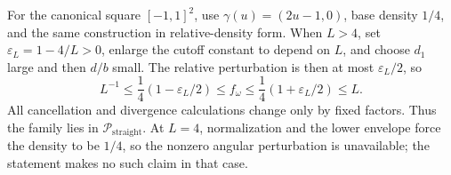 For the canonical square \([-1,1]^2\), use
\(\gamma(u)=(2u-1,0)\), base density \(1/4\), and the same construction in
relative-density form.  When \(L>4\), set
\(\varepsilon_L=1-4/L>0\), enlarge the cutoff constant to depend on \(L\),
and choose \(d_1\) large and then \(d/b\) small.  The relative perturbation is
then at most \(\varepsilon_L/2\), so
\[
 L^{-1}\leq\frac14(1-\varepsilon_L/2)
 \leq f_\omega\leq\frac14(1+\varepsilon_L/2)\leq L.
\]
All cancellation and divergence calculations change only by fixed factors.
Thus the family lies in \(\mathcal P_{\mathrm{straight}}\).  At \(L=4\),
normalization and the lower envelope force the density to be \(1/4\), so the
nonzero angular perturbation is unavailable; the statement makes no such claim
in that case.